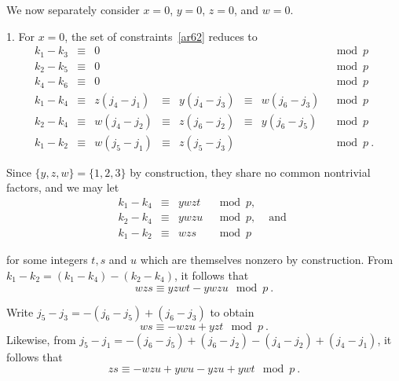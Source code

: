 We now separately consider $x=0$, $y=0$, $z=0$, and $w=0$.

1. For $x=0$, the set of constraints~\eqref{ar62} reduces to
\begin{equation}\begin{array}{ccccccccc}
k_1-k_3 &\equiv& 0 & {}& {}&{}&{}&\mod p
\\
k_2-k_5 &\equiv& 0 & {}& {}&{}&{}&\mod p
\\
k_4-k_6 &\equiv& 0 & {}& {}&{}&{}&\mod p
\\ k_1-k_4 &\equiv&
z(j_4-j_1)& \equiv& y(j_4-j_3)& \equiv& w(j_6-j_3) &\mod p
\\
k_2-k_4 &\equiv& w(j_4-j_2) &\equiv&  z(j_6-j_2) &\equiv&
y(j_6-j_5) &\mod
p\\
k_1-k_2 &\equiv& w(j_5-j_1) &\equiv& z(j_5-j_3) & {}&{}&\mod p~.
\end{array}\end{equation}

Since $\{y,z,w\}=\{1,2,3\}$ by construction, they share no common
nontrivial factors, and we may let
\begin{equation}\begin{array}{ccccc}k_1-k_4 &\equiv& ywzt &\mod p, &{} \\
k_2-k_4 &\equiv& ywzu &\mod p, &\text{ and }\\k_1-k_2 &\equiv& wzs
&\mod p&{}
\end{array}\end{equation}

for some integers $t,s$ and $u$ which are themselves nonzero by
construction. From $k_1-k_2=(k_1-k_4)-(k_2-k_4)$, it follows that
\begin{equation}\label{eq621}
wzs \equiv yzwt -ywzu \mod p~.
\end{equation}

Write $j_5-j_3=-(j_6-j_5)+(j_6-j_3)$ to obtain
\begin{equation}\label{eq622}
ws \equiv -wzu +yzt \mod p~.
\end{equation}
Likewise, from $j_5-j_1=-(j_6-j_5)+(j_6-j_2)-(j_4-j_2)+(j_4-j_1)$,
it follows that
\begin{equation}\label{eq623}
zs \equiv -wzu +ywu -yzu +ywt \mod p~.
\end{equation}

